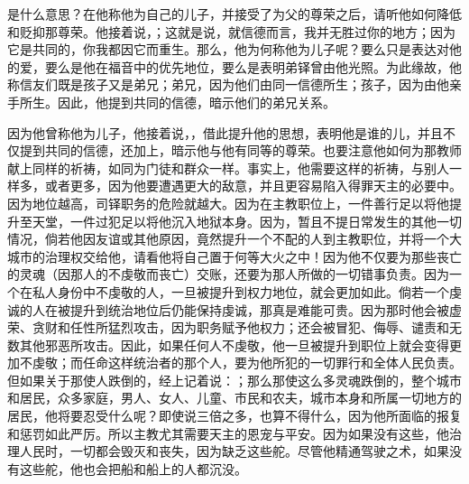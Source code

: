 \par

是什么意思？在他称他为自己的儿子，并接受了为父的尊荣之后，请听他如何降低和贬抑那尊荣。他接着说，；这就是说，就信德而言，我并无胜过你的地方；因为它是共同的，你我都因它而重生。那么，他为何称他为儿子呢？要么只是表达对他的爱，要么是他在福音中的优先地位，要么是表明弟铎曾由他光照。为此缘故，他称信友们既是孩子又是弟兄；弟兄，因为他们由同一信德所生；孩子，因为由他亲手所生。因此，他提到共同的信德，暗示他们的弟兄关系。\par

\par

因为他曾称他为儿子，他接着说，，借此提升他的思想，表明他是谁的儿，并且不仅提到共同的信德，还加上，暗示他与他有同等的尊荣。也要注意他如何为那教师献上同样的祈祷，如同为门徒和群众一样。事实上，他需要这样的祈祷，与别人一样多，或者更多，因为他要遭遇更大的敌意，并且更容易陷入得罪天主的必要中。因为地位越高，司铎职务的危险就越大。因为在主教职位上，一件善行足以将他提升至天堂，一件过犯足以将他沉入地狱本身。因为，暂且不提日常发生的其他一切情况，倘若他因友谊或其他原因，竟然提升一个不配的人到主教职位，并将一个大城市的治理权交给他，请看他将自己置于何等大火之中！因为他不仅要为那些丧亡的灵魂（因那人的不虔敬而丧亡）交账，还要为那人所做的一切错事负责。因为一个在私人身份中不虔敬的人，一旦被提升到权力地位，就会更加如此。倘若一个虔诚的人在被提升到统治地位后仍能保持虔诚，那真是难能可贵。因为那时他会被虚荣、贪财和任性所猛烈攻击，因为职务赋予他权力；还会被冒犯、侮辱、谴责和无数其他邪恶所攻击。因此，如果任何人不虔敬，他一旦被提升到职位上就会变得更加不虔敬；而任命这样统治者的那个人，要为他所犯的一切罪行和全体人民负责。但如果关于那使人跌倒的，经上记着说：；那么那使这么多灵魂跌倒的，整个城市和居民，众多家庭，男人、女人、儿童、市民和农夫，城市本身和所属一切地方的居民，他将要忍受什么呢？即使说三倍之多，也算不得什么，因为他所面临的报复和惩罚如此严厉。所以主教尤其需要天主的恩宠与平安。因为如果没有这些，他治理人民时，一切都会毁灭和丧失，因为缺乏这些舵。尽管他精通驾驶之术，如果没有这些舵，他也会把船和船上的人都沉没。\par

